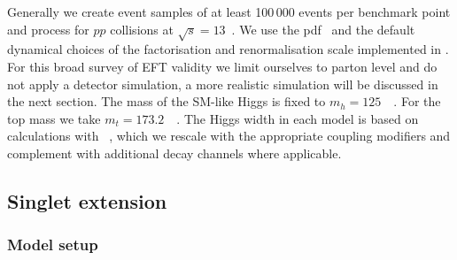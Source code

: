 Generally we create event samples of at least 100\,000 events per
benchmark point and process for $pp$ collisions at
$\sqrt{s} = 13$~\tev. We use the 
pdf~\cite{Pumplin:2002vw} and the default dynamical choices of the
factorisation and renormalisation scale implemented in
. For this broad survey of EFT validity we limit
ourselves to parton level and do not apply a detector simulation, a
more realistic simulation will be discussed in the next section. The
mass of the SM-like Higgs is fixed to
$m_h = 125$~\gev~\cite{Aad:2015zhl}. For the top mass we take
$m_t = 173.2$~\gev~\cite{Tevatron:2014cka, ATLAS:2014wva}. The Higgs
width in each model is based on calculations with
~\cite{Djouadi:1997yw}, which we rescale with the
appropriate coupling modifiers and complement with additional decay
channels where applicable.



\subsection{Singlet extension}
\label{sec:validity_singlet}

\subsubsection{Model setup}

